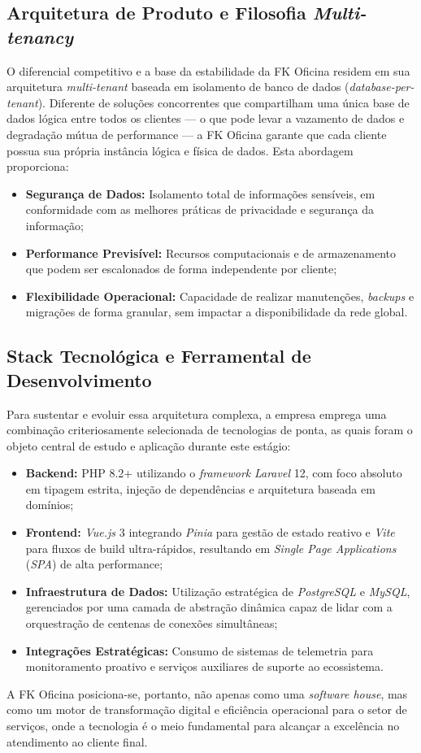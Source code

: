 \subsection{Arquitetura de Produto e Filosofia \textit{Multi-tenancy}}

O diferencial competitivo e a base da estabilidade da FK Oficina residem em sua arquitetura \textit{multi-tenant} baseada em isolamento de banco de dados (\textit{database-per-tenant}). Diferente de soluções concorrentes que compartilham uma única base de dados lógica entre todos os clientes — o que pode levar a vazamento de dados e degradação mútua de performance — a FK Oficina garante que cada cliente possua sua própria instância lógica e física de dados. Esta abordagem proporciona:
\begin{itemize}
    \item \textbf{Segurança de Dados:} Isolamento total de informações sensíveis, em conformidade com as melhores práticas de privacidade e segurança da informação;
    \item \textbf{Performance Previsível:} Recursos computacionais e de armazenamento que podem ser escalonados de forma independente por cliente;
    \item \textbf{Flexibilidade Operacional:} Capacidade de realizar manutenções, \textit{backups} e migrações de forma granular, sem impactar a disponibilidade da rede global.
\end{itemize}

\subsection{Stack Tecnológica e Ferramental de Desenvolvimento}

Para sustentar e evoluir essa arquitetura complexa, a empresa emprega uma combinação criteriosamente selecionada de tecnologias de ponta, as quais foram o objeto central de estudo e aplicação durante este estágio:
\begin{itemize}
    \item \textbf{Backend:} PHP 8.2+ utilizando o \textit{framework} \textit{Laravel} 12, com foco absoluto em tipagem estrita, injeção de dependências e arquitetura baseada em domínios;
    \item \textbf{Frontend:} \textit{Vue.js} 3 integrando \textit{Pinia} para gestão de estado reativo e \textit{Vite} para fluxos de build ultra-rápidos, resultando em \textit{Single Page Applications} (\textit{SPA}) de alta performance;
    \item \textbf{Infraestrutura de Dados:} Utilização estratégica de \textit{PostgreSQL} e \textit{MySQL}, gerenciados por uma camada de abstração dinâmica capaz de lidar com a orquestração de centenas de conexões simultâneas;
    \item \textbf{Integrações Estratégicas:} Consumo de sistemas de telemetria para monitoramento proativo e serviços auxiliares de suporte ao ecossistema.
\end{itemize}

A FK Oficina posiciona-se, portanto, não apenas como uma \textit{software house}, mas como um motor de transformação digital e eficiência operacional para o setor de serviços, onde a tecnologia é o meio fundamental para alcançar a excelência no atendimento ao cliente final.
